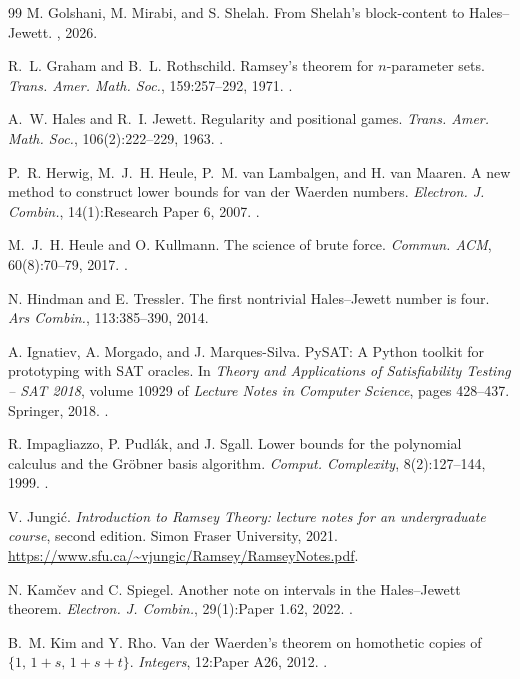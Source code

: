 \documentclass[12pt]{article}
\begin{document}
\begin{thebibliography}{99}
M. Golshani, M. Mirabi, and S. Shelah. From Shelah's block-content to
Hales--Jewett. , 2026.

R.~L. Graham and B.~L. Rothschild. Ramsey's theorem for $n$-parameter
sets. \emph{Trans. Amer. Math. Soc.}, 159:257--292, 1971.
.

A.~W. Hales and R.~I. Jewett. Regularity and positional games.
\emph{Trans. Amer. Math. Soc.}, 106(2):222--229, 1963.
.

P.~R. Herwig, M.~J.~H. Heule, P.~M. van Lambalgen, and H. van Maaren.
A new method to construct lower bounds for van der Waerden numbers.
\emph{Electron. J. Combin.}, 14(1):Research Paper 6, 2007.
.

M.~J.~H. Heule and O. Kullmann. The science of brute force.
\emph{Commun. ACM}, 60(8):70--79, 2017. .

N. Hindman and E. Tressler. The first nontrivial Hales--Jewett number
is four. \emph{Ars Combin.}, 113:385--390, 2014.

A. Ignatiev, A. Morgado, and J. Marques-Silva. {PySAT}: A {Python}
toolkit for prototyping with {SAT} oracles. In \emph{Theory and
Applications of Satisfiability Testing -- SAT 2018}, volume 10929 of
\emph{Lecture Notes in Computer Science}, pages 428--437. Springer,
2018. .

R. Impagliazzo, P. Pudl\'ak, and J. Sgall. Lower bounds for the
polynomial calculus and the Gr\"obner basis algorithm.
\emph{Comput. Complexity}, 8(2):127--144, 1999.
.

V. Jungi\'c. \emph{Introduction to Ramsey Theory: lecture notes for an
undergraduate course}, second edition. Simon Fraser University, 2021.
\url{https://www.sfu.ca/~vjungic/Ramsey/RamseyNotes.pdf}.

N. Kam\v{c}ev and C. Spiegel. Another note on intervals in the
Hales--Jewett theorem. \emph{Electron. J. Combin.}, 29(1):Paper 1.62,
2022. .

B.~M. Kim and Y. Rho. Van der Waerden's theorem on homothetic copies of
$\{1,\,1+s,\,1+s+t\}$. \emph{Integers}, 12:Paper A26, 2012.
.


\end{thebibliography}
\end{document}
